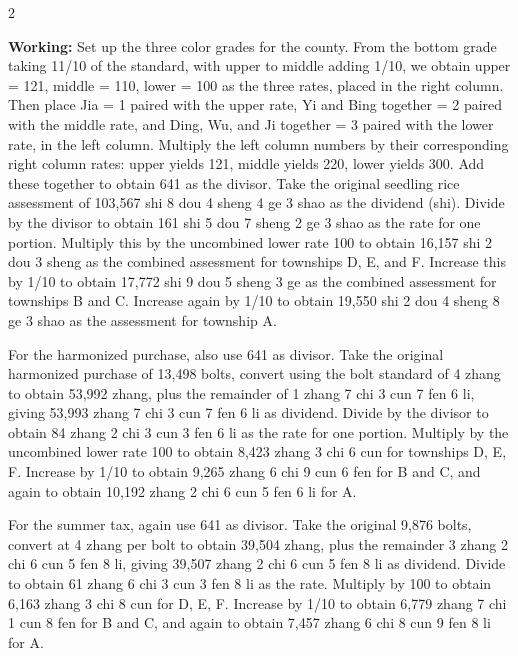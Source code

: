 \documentclass[11pt,a4paper]{article}
\newcommand{\WorkingEn}[1]{\par\noindent\textbf{Working:} #1\par}
\begin{document}
\begin{paracol}{2}
\switchcolumn

\WorkingEn{Set up the three color grades for the county. From the bottom grade taking 11/10 of the standard, with upper to middle adding 1/10, we obtain upper = 121, middle = 110, lower = 100 as the three rates, placed in the right column. Then place Jia = 1 paired with the upper rate, Yi and Bing together = 2 paired with the middle rate, and Ding, Wu, and Ji together = 3 paired with the lower rate, in the left column. Multiply the left column numbers by their corresponding right column rates: upper yields 121, middle yields 220, lower yields 300. Add these together to obtain 641 as the divisor. Take the original seedling rice assessment of 103,567 shi 8 dou 4 sheng 4 ge 3 shao as the dividend (shi). Divide by the divisor to obtain 161 shi 5 dou 7 sheng 2 ge 3 shao as the rate for one portion. Multiply this by the uncombined lower rate 100 to obtain 16,157 shi 2 dou 3 sheng as the combined assessment for townships D, E, and F. Increase this by 1/10 to obtain 17,772 shi 9 dou 5 sheng 3 ge as the combined assessment for townships B and C. Increase again by 1/10 to obtain 19,550 shi 2 dou 4 sheng 8 ge 3 shao as the assessment for township A.

For the harmonized purchase, also use 641 as divisor. Take the original harmonized purchase of 13,498 bolts, convert using the bolt standard of 4 zhang to obtain 53,992 zhang, plus the remainder of 1 zhang 7 chi 3 cun 7 fen 6 li, giving 53,993 zhang 7 chi 3 cun 7 fen 6 li as dividend. Divide by the divisor to obtain 84 zhang 2 chi 3 cun 3 fen 6 li as the rate for one portion. Multiply by the uncombined lower rate 100 to obtain 8,423 zhang 3 chi 6 cun for townships D, E, F. Increase by 1/10 to obtain 9,265 zhang 6 chi 9 cun 6 fen for B and C, and again to obtain 10,192 zhang 2 chi 6 cun 5 fen 6 li for A.

For the summer tax, again use 641 as divisor. Take the original 9,876 bolts, convert at 4 zhang per bolt to obtain 39,504 zhang, plus the remainder 3 zhang 2 chi 6 cun 5 fen 8 li, giving 39,507 zhang 2 chi 6 cun 5 fen 8 li as dividend. Divide to obtain 61 zhang 6 chi 3 cun 3 fen 8 li as the rate. Multiply by 100 to obtain 6,163 zhang 3 chi 8 cun for D, E, F. Increase by 1/10 to obtain 6,779 zhang 7 chi 1 cun 8 fen for B and C, and again to obtain 7,457 zhang 6 chi 8 cun 9 fen 8 li for A.}

\end{paracol}
\end{document}
